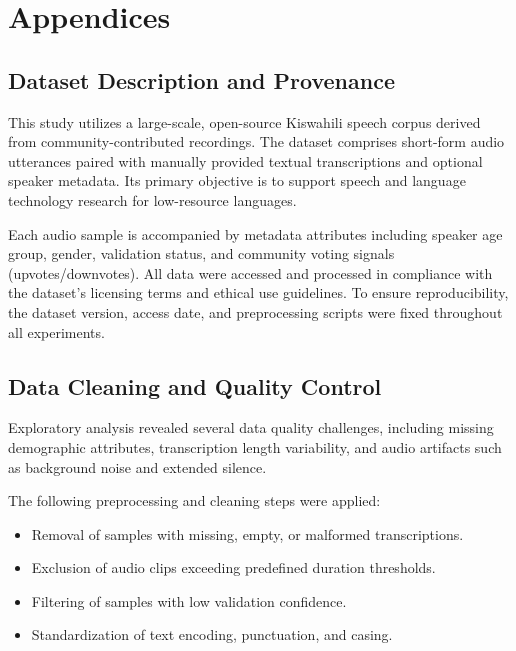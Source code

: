\chapter{Appendices}%
\section*{Dataset Description and Provenance}
\label{app:dataset}

This study utilizes a large-scale, open-source Kiswahili speech corpus derived from community-contributed recordings. The dataset comprises short-form audio utterances paired with manually provided textual transcriptions and optional speaker metadata. Its primary objective is to support speech and language technology research for low-resource languages.

Each audio sample is accompanied by metadata attributes including speaker age group, gender, validation status, and community voting signals (upvotes/downvotes). All data were accessed and processed in compliance with the dataset’s licensing terms and ethical use guidelines. To ensure reproducibility, the dataset version, access date, and preprocessing scripts were fixed throughout all experiments.

\section*{Data Cleaning and Quality Control}
\label{app:data_cleaning}

Exploratory analysis revealed several data quality challenges, including missing demographic attributes, transcription length variability, and audio artifacts such as background noise and extended silence.

The following preprocessing and cleaning steps were applied:

\begin{itemize}
    \item Removal of samples with missing, empty, or malformed transcriptions.
    \item Exclusion of audio clips exceeding predefined duration thresholds.
    \item Filtering of samples with low validation confidence.
    \item Standardization of text encoding, punctuation, and casing.
\end{itemize}

